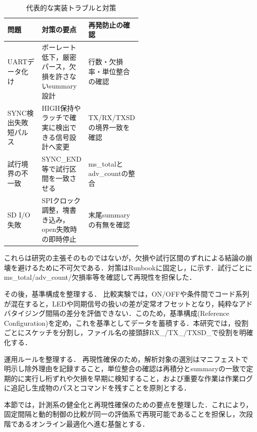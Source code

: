 \begin{table}[tb]
  \centering
  \caption{代表的な実装トラブルと対策}
  \label{tab:implementation_troubles_summary}
  \begin{tabularx}{\linewidth}{p{0.26\linewidth}X p{0.28\linewidth}}
    \toprule
    問題 & 対策の要点 & 再発防止の確認 \\
    \midrule
    UARTデータ化け & ボーレート低下，厳密パース，欠損を許さないsummary設計 & 行数・欠損率・単位整合の確認 \\
    SYNC検出失敗 短パルス & HIGH保持やラッチで確実に検出できる信号設計へ変更 & TX/RX/TXSDの境界一致を確認 \\
    試行境界の不一致 & SYNC\_END等で試行区間を一致させる & ms\_totalとadv\_countの整合 \\
    SD I/O失敗 & SPIクロック調整，塊書き込み，open失敗時の即時停止 & 末尾summaryの有無を確認 \\
    \bottomrule
  \end{tabularx}
\end{table}
これらは研究の主張そのものではないが，欠損や試行区間のずれによる結論の崩壊を避けるために不可欠である．対策はRunbookに固定し，に示す．試行ごとにms\_total/adv\_count/欠損率等を確認して再現性を担保した．

その後，基準構成を整理する．
比較実験では，ON/OFFや条件間でコード系列が混在すると，LEDや同期信号の扱いの差が定常オフセットとなり，純粋なアドバタイジング間隔の差分を評価できない．このため，基準構成(Reference Configuration)を定め，これを基準としてデータを蓄積する．本研究では，役割ごとにスケッチを分割し，ファイル名の接頭辞RX\_/TX\_/TXSD\_で役割を明確化する．

運用ルールを整理する．
再現性確保のため，解析対象の選別はマニフェストで明示し除外理由を記録すること，単位整合の確認は再積分とsummaryの一致で定期的に実行し桁ずれや欠損を早期に検知すること，および重要な作業は作業ログに追記し生成物のパスとコマンドを残すことを原則とする．

本節では，計測系の健全化と再現性確保のための要点を整理した．これにより，固定間隔と動的制御の比較が同一の評価系で再現可能であることを担保し，次段階であるオンライン最適化へ進む基盤とする．





